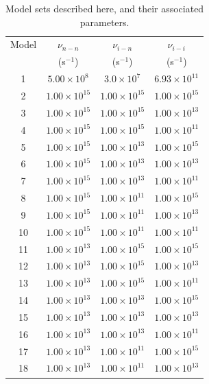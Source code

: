 \documentclass[journal=aesccq,manuscript=article,layout=twocolumn]{achemso}
\begin{document}
\begin{table}[p!]
  \centering
    \footnotesize
  \caption{Model sets described here, and their associated parameters.}
  \label{tbl:parameters}
  \begin{tabular}{cccc}
    \hline
     Model & $\nu_{n-n}$  & $\nu_{i-n}$ & $\nu_{i-i}$ \\
     & (s$^{-1}$)   &   (s$^{-1}$)&   (s$^{-1}$)\\                
    \hline
    1 & $5.00\times10^{8}$  & $3.0\times10^{7}$ & $6.93\times10^{11}$ \\
2  & \(1.00 \times 10^{15}\) & \(1.00 \times 10^{15}\) & \(1.00 \times 10^{15}\) \\
3  & \(1.00 \times 10^{15}\) & \(1.00 \times 10^{15}\) & \(1.00 \times 10^{13}\) \\
4  & \(1.00 \times 10^{15}\) & \(1.00 \times 10^{15}\) & \(1.00 \times 10^{11}\) \\
5  & \(1.00 \times 10^{15}\) & \(1.00 \times 10^{13}\) & \(1.00 \times 10^{15}\) \\
6  & \(1.00 \times 10^{15}\) & \(1.00 \times 10^{13}\) & \(1.00 \times 10^{13}\) \\
7  & \(1.00 \times 10^{15}\) & \(1.00 \times 10^{13}\) & \(1.00 \times 10^{11}\) \\
8  & \(1.00 \times 10^{15}\) & \(1.00 \times 10^{11}\) & \(1.00 \times 10^{15}\) \\
9  & \(1.00 \times 10^{15}\) & \(1.00 \times 10^{11}\) & \(1.00 \times 10^{13}\) \\
10 & \(1.00 \times 10^{15}\) & \(1.00 \times 10^{11}\) & \(1.00 \times 10^{11}\) \\
11 & \(1.00 \times 10^{13}\) & \(1.00 \times 10^{15}\) & \(1.00 \times 10^{15}\) \\
12 & \(1.00 \times 10^{13}\) & \(1.00 \times 10^{15}\) & \(1.00 \times 10^{13}\) \\
13 & \(1.00 \times 10^{13}\) & \(1.00 \times 10^{15}\) & \(1.00 \times 10^{11}\) \\
14 & \(1.00 \times 10^{13}\) & \(1.00 \times 10^{13}\) & \(1.00 \times 10^{15}\) \\
15 & \(1.00 \times 10^{13}\) & \(1.00 \times 10^{13}\) & \(1.00 \times 10^{13}\) \\
16 & \(1.00 \times 10^{13}\) & \(1.00 \times 10^{13}\) & \(1.00 \times 10^{11}\) \\
17 & \(1.00 \times 10^{13}\) & \(1.00 \times 10^{11}\) & \(1.00 \times 10^{15}\) \\
18 & \(1.00 \times 10^{13}\) & \(1.00 \times 10^{11}\) & \(1.00 \times 10^{13}\) \\

\end{tabular}
\end{table}
\end{document}
